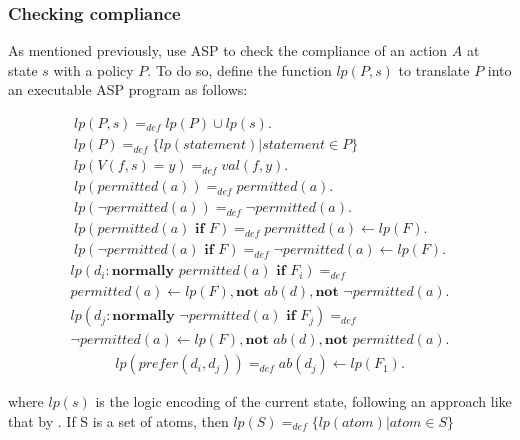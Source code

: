 \subsubsection{Checking compliance}

As mentioned previously, \citet{gelfond_authorization_2008} use ASP to check the compliance of an action $A$ at state $s$ with a policy $P$.
To do so, \citet{gelfond_authorization_2008} define the function $lp(P,s)$ to translate $P$ into an executable ASP program as follows:

\begin{gather}
    lp(P,s) =_{def} lp(P)\cup lp(s). \label{eq:apl_lp_01} \\
    lp(P)=_{def}\{lp(statement) | statement \in P\} \label{eq:apl_lp_02} \\
    lp\left(V(f,s)=y\right) =_{def}
        val\left(f,y\right). \label{eq:apl_lp_03} \\
    lp(permitted(a)) =_{def}
        permitted(a). \label{eq:apl_lp_04} \\
    lp(\neg permitted(a)) =_{def}
        \neg permitted(a). \label{eq:apl_lp_05} \\
    lp(permitted(a) \textbf{ if } F) =_{def}
        permitted(a) \leftarrow
            lp(F). \label{eq:apl_lp_06} \\
    lp(\neg permitted(a) \textbf{ if } F) =_{def}
        \neg permitted(a) \leftarrow
            lp(F). \label{eq:apl_lp_07}
\end{gather}
\begin{multline}
    \label{eq:apl_lp_08}
    lp(d_i: \textbf{normally } permitted(a) \textbf{ if } F_i) =_{def} \\
        permitted(a) \leftarrow
            lp(F),
            \textbf{not } ab(d),
            \textbf{not } \neg permitted(a).
\end{multline}
\begin{multline}
    \label{eq:apl_lp_09}
    lp(d_j: \textbf{normally } \neg permitted(a) \textbf{ if } F_j) =_{def} \\
        \neg permitted(a) \leftarrow
        lp(F),
        \textbf{not } ab(d),
        \textbf{not } permitted(a).
\end{multline}
\begin{gather}
    lp(prefer(d_i, d_j)) =_{def}
        ab(d_j) \leftarrow lp(F_1). \label{eq:apl_lp_10}
\end{gather}

\noindent
where $lp(s)$ is the logic encoding of the current state, following an approach like that by \citet{balduccini_aaa_2008}.
If S is a set of atoms, then $lp(S)=_{def}\{lp(atom) | atom \in S\}$

